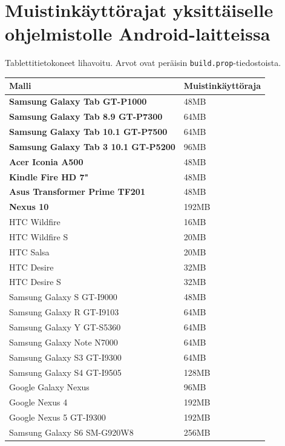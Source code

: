 \documentclass[utf8]{gradu3}
\begin{document}
\newpage

\section{Muistinkäyttörajat yksittäiselle ohjelmistolle Android-laitteissa}

Tablettitietokoneet lihavoitu. Arvot ovat peräisin \texttt{build.prop}-tiedostoista. \parencite[]{android-memory-use}

\begin{center}
    \begin{tabular}{| l | l |}
    \hline
    \textbf{Malli} & \textbf{Muistinkäyttöraja} \\ \hline
    \textbf{Samsung Galaxy Tab GT-P1000} & 48MB  \\ \hline
    \textbf{Samsung Galaxy Tab 8.9 GT-P7300} & 64MB \\ \hline
    \textbf{Samsung Galaxy Tab 10.1 GT-P7500} & 64MB \\ \hline
    \textbf{Samsung Galaxy Tab 3 10.1 GT-P5200} & 96MB \\ \hline
    \textbf{Acer Iconia A500} & 48MB \\ \hline
    \textbf{Kindle Fire HD 7"} & 48MB \\ \hline
    \textbf{Asus Transformer Prime TF201} & 48MB \\ \hline
    \textbf{Nexus 10} & 192MB \\ \hline
    HTC Wildfire & 16MB \\ \hline
    HTC Wildfire S & 20MB \\ \hline
    HTC Salsa & 20MB \\ \hline
    HTC Desire & 32MB \\ \hline
    HTC Desire S & 32MB \\ \hline
    Samsung Galaxy S GT-I9000 & 48MB \\ \hline
    Samsung Galaxy R GT-I9103 & 64MB \\ \hline
    Samsung Galaxy Y GT-S5360 & 64MB \\ \hline
    Samsung Galaxy Note N7000 & 64MB \\ \hline
    Samsung Galaxy S3 GT-I9300 & 64MB \\ \hline
    Samsung Galaxy S4 GT-I9505 & 128MB \\ \hline
    Google Galaxy Nexus & 96MB \\ \hline
    Google Nexus 4 & 192MB \\ \hline
    Google Nexus 5 GT-I9300 & 192MB \\ \hline
    Samsung Galaxy S6 SM-G920W8 & 256MB \\ \hline
    \end{tabular}
\end{center}
\end{document}
